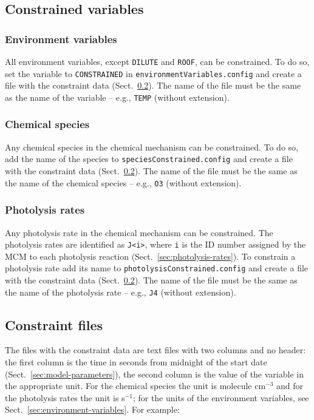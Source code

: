 \subsection{Constrained variables} \label{subsec:constrained-variables}

\subsubsection{Environment variables}

All environment variables, except \texttt{DILUTE} and \texttt{ROOF},
can be constrained. To do so, set the variable to \texttt{CONSTRAINED}
in \texttt{environmentVariables.config} and create a file with the
constraint data (Sect.~\ref{subsec:constraint-files}). The name of the
file must be the same as the name of the variable -- e.g.,
\texttt{TEMP} (without extension).

\subsubsection{Chemical species}

Any chemical species in the chemical mechanism can be constrained. To
do so, add the name of the species to
\texttt{speciesConstrained.config} and create a file with the
constraint data (Sect.~\ref{subsec:constraint-files}). The name of the
file must be the same as the name of the chemical species -- e.g.,
\texttt{O3} (without extension).

\subsubsection{Photolysis rates}

Any photolysis rate in the chemical mechanism can be constrained. The
photolysis rates are identified as \texttt{J<i>}, where \texttt{i} is
the ID number assigned by the MCM to each photolysis reaction
(Sect.~\ref{sec:photolysis-rates}). To constrain a photolysis rate add
its name to \texttt{photolysisConstrained.config} and create a file
with the constraint data (Sect.~\ref{subsec:constraint-files}). The
name of the file must be the same as the name of the photolysis rate
-- e.g., \texttt{J4} (without extension).

\subsection{Constraint files} \label{subsec:constraint-files}

The files with the constraint data are text files with two columns and
no header: the first column is the time in seconds from midnight of
the start date (Sect.~\ref{sec:model-parameters}), the second column
is the value of the variable in the appropriate unit. For the chemical
species the unit is molecule cm$^{-3}$ and for the photolysis rates
the unit is s$^{-1}$; for the units of the environment variables, see
Sect.~\ref{sec:environment-variables}. For example:

